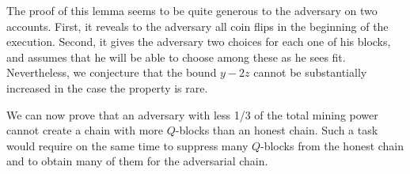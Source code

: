 

The proof of this lemma seems to be quite generous to the adversary on two
accounts. First, it reveals to the adversary all coin flips in the beginning
of the execution. Second, it gives the adversary two choices for each one of
his blocks, and assumes that he will be able to choose among these as he sees
fit. Nevertheless, we conjecture that the bound $y-2z$ cannot be substantially
increased in the case the property is rare.


%

We can now prove that an adversary with less 1/3 of the total mining power
cannot create a chain with more $Q$-blocks than an honest chain. Such a task
would require on the same time to suppress many $Q$-blocks from the honest
chain and to obtain many of them for the adversarial chain.

